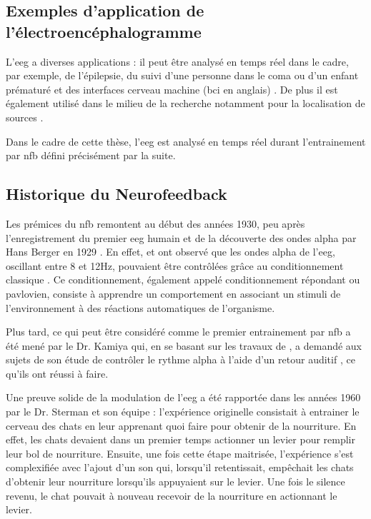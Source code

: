 \subsection{Exemples d'application de l'électroencéphalogramme}

L'\gls{eeg} a diverses applications : il peut être analysé en temps réel dans le cadre, par exemple, de l'épilepsie, du suivi d'une personne dans 
le coma ou d'un enfant prématuré et des interfaces cerveau machine (\gls{bci} en anglais) \citep{Li2010}. De plus il 
est également utilisé dans le milieu de la recherche notamment pour la localisation de sources \citep{Latif2006}.

Dans le cadre de cette thèse, l'\gls{eeg} est analysé en temps réel durant l'entrainement par \gls{nfb} défini précisément par la suite.  
 

\subsection{Historique du Neurofeedback}

Les prémices du \gls{nfb} remontent au début des années 1930, peu après l'enregistrement du premier \gls{eeg} humain et de la découverte des ondes alpha par Hans Berger en 1929 \citep{Berger1929}.
En effet, \citet{Durup1935} et \citet{Loomis1936} ont observé que les ondes alpha de l'\gls{eeg}, oscillant entre 8 et 12Hz, pouvaient être contrôlées grâce au 
conditionnement classique \citep{Pavlov1929}. Ce conditionnement, également appelé conditionnement répondant ou pavlovien, consiste à apprendre un comportement en associant un stimuli
de l'environnement à des réactions automatiques de l'organisme.

Plus tard, ce qui peut être considéré comme le premier entrainement par \gls{nfb} a été mené par le Dr. Kamiya qui, en se basant sur les travaux de \citet{Durup1935}, 
a demandé aux sujets de son étude de contrôler le rythme alpha à l'aide d'un retour auditif \citep{Kamiya1969}, ce qu'ils ont réussi à faire. 

Une preuve solide de la modulation de l'\gls{eeg} a été rapportée dans les années 1960 par le Dr. Sterman et son équipe \citep{Sterman1969} : l'expérience 
originelle consistait à entrainer le cerveau des chats en leur apprenant quoi faire pour obtenir de 
la nourriture. En effet, les chats devaient dans un premier temps actionner un levier pour remplir leur bol de nourriture. Ensuite, une fois cette étape maitrisée, 
l'expérience s'est complexifiée avec l'ajout d'un son qui, lorsqu'il retentissait, empêchait les chats d'obtenir leur nourriture lorsqu'ils appuyaient sur le levier.
Une fois le silence revenu, le chat pouvait à nouveau recevoir de la nourriture en actionnant le levier.  

